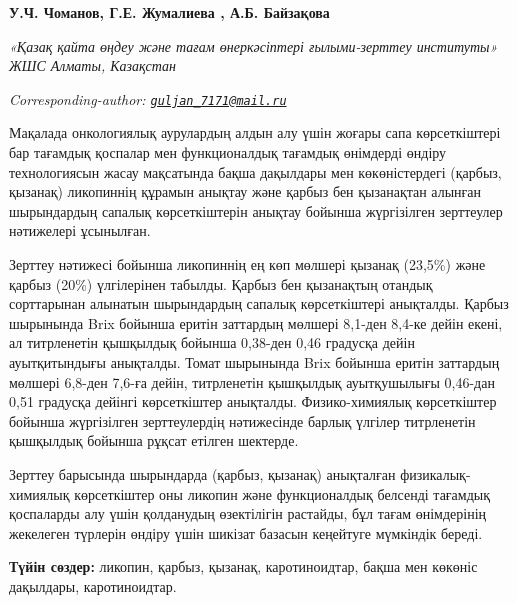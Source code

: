 
\begin{articleheader}

{\bfseries У.Ч. Чоманов\authorid,
Г.Е. Жумалиева\textsuperscript{\envelope } \authorid,
А.Б. Байзақова\authorid}
\end{articleheader}

\begin{affiliation}
\emph{«Қазақ қайта өңдеу және тағам өнеркәсіптері ғылыми-зерттеу институты» ЖШС Алматы, Казақстан}

\raggedright \textsuperscript{\envelope }{\em Corresponding-author: \href{mailto:guljan_7171@mail.ru}{\nolinkurl{guljan\_7171@mail.ru}}}
\end{affiliation}

Мақалада онкологиялық аурулардың алдын алу үшін жоғары сапа
көрсеткіштері бар тағамдық қоспалар мен функционалдық тағамдық өнімдерді
өндіру технологиясын жасау мақсатында бақша дақылдары мен көкөністердегі
(қарбыз, қызанақ) ликопиннің құрамын анықтау және қарбыз бен қызанақтан
алынған шырындардың сапалық көрсеткіштерін анықтау бойынша жүргізілген
зерттеулер нәтижелері ұсынылған.

Зерттеу нәтижесі бойынша ликопиннің ең көп мөлшері қызанақ (23,5\%) және
қарбыз (20\%) үлгілерінен табылды. Қарбыз бен қызанақтың отандық
сорттарынан алынатын шырындардың сапалық көрсеткіштері анықталды. Қарбыз
шырынында Brix бойынша еритін заттардың мөлшері 8,1-ден 8,4-ке дейін
екені, ал титрленетін қышқылдық бойынша 0,38-ден 0,46 градусқа дейін
ауытқитындығы анықталды. Томат шырынында Brix бойынша еритін заттардың
мөлшері 6,8-ден 7,6-ға дейін, титрленетін қышқылдық ауытқушылығы
0,46-дан 0,51 градусқа дейінгі көрсеткіштер анықталды. Физико-химиялық
көрсеткіштер бойынша жүргізілген зерттеулердің нәтижесінде барлық
үлгілер титрленетін қышқылдық бойынша рұқсат етілген шектерде.

Зерттеу барысында шырындарда (қарбыз, қызанақ) анықталған
физикалық-химиялық көрсеткіштер оны ликопин және функционалдық белсенді
тағамдық қоспаларды алу үшін қолданудың өзектілігін растайды, бұл тағам
өнімдерінің жекелеген түрлерін өндіру үшін шикізат базасын кеңейтуге
мүмкіндік береді.

{\bfseries Түйін сөздер:} ликопин, қарбыз, қызанақ, каротиноидтар, бақша
мен көкөніс дақылдары, каротиноидтар.

